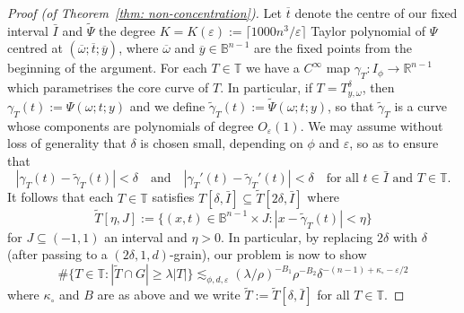 \documentclass[reqno]{amsart}
\numberwithin{equation}{section}
\newcommand{\B}{\mathbb{B}}
\newcommand{\R}{\mathbb{R}}
\newcommand{\T}{\mathbb{T}}
\theoremstyle{plain}
\theoremstyle{definition}
\newcommand{\ceil}[1]{\lceil #1 \rceil }
\begin{document}
\begin{proof}[Proof (of Theorem~\ref{thm: non-concentration})]
Let $\overline{t}$ denote the centre of our fixed interval $\bar{I}$ and $\widetilde{\Psi}$ the degree $K = K(\varepsilon) := \ceil{1000n^3/\varepsilon}$ Taylor polynomial of $\Psi$ centred at $(\overline{\omega}; \overline{t}; \overline{y})$, where $\overline{\omega}$ and $\overline{y} \in \B^{n-1}$ are the fixed points from the beginning of the argument. For each $T \in \T$ we have a $C^{\infty}$ map $\gamma_T \colon I_\phi \to \R^{n-1}$ which parametrises the core curve of $T$. In particular, if $T = T_{y,\omega}^{\delta}$, then $\gamma_T(t) := \Psi(\omega; t; y)$ and we define $\widetilde{\gamma}_T(t) := \widetilde{\Psi}(\omega; t; y)$, so that $\widetilde{\gamma}_T$ is a curve whose components are polynomials of degree $O_{\varepsilon}(1)$. We may assume without loss of generality that $\delta$ is chosen small, depending on $\phi$ and $\varepsilon$, so as to ensure that
\begin{equation*}
    |\gamma_T(t) - \widetilde{\gamma}_T(t)| < \delta \quad \textrm{and} \quad  |\gamma_T'(t) - \widetilde{\gamma}_T'(t)| < \delta \quad \textrm{for all $t \in \bar{I}$ and $T \in \T$.}
\end{equation*}
It follows that each $T \in \T$ satisfies $T[\delta, \bar{I}] \subseteq \widetilde{T}[2\delta, \bar{I}]$ where
\begin{equation*}
  \widetilde{T}[\eta, J]   := \big\{(x,t) \in \B^{n-1} \times J : |x - \widetilde{\gamma}_T(t)| < \eta \big\}
\end{equation*}
for $J \subseteq (-1,1)$ an interval and $\eta >0$. In particular, by replacing $2\delta$ with $\delta$ (after passing to a $(2\delta, 1, d)$-grain), our problem is now to show
\begin{equation}\label{eq: poly approx 2}
    \#\{T \in \T : |\widetilde{T} \cap G| \geq \lambda |T| \} \lesssim_{\phi, d, \varepsilon} (\lambda/\rho)^{-B_1} \rho^{-B_2} \delta^{-(n-1) + \kappa_{\circ} - \varepsilon/2}
\end{equation}
where $\kappa_{\circ}$ and $B$ are as above and we write $\widetilde{T} := \widetilde{T}[\delta, \bar{I}]$ for all $T \in \T$. 
\medskip





\end{proof}
\end{document}
